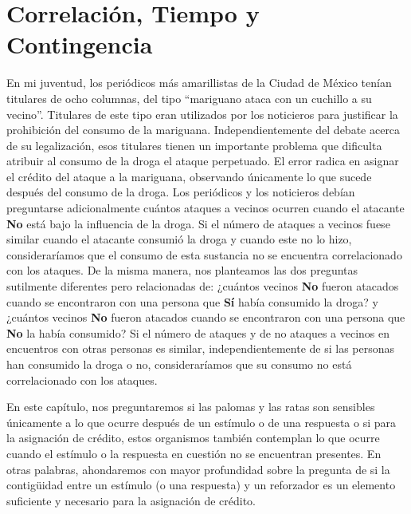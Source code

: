 \documentclass[
  a4paper,
  DIV=11,
  numbers=noendperiod]{scrreprt}
\begin{document}

\chapter{Correlación, Tiempo y
Contingencia}\label{correlaciuxf3n-tiempo-y-contingencia}

En mi juventud, los periódicos más amarillistas de la Ciudad de México
tenían titulares de ocho columnas, del tipo ``mariguano ataca con un
cuchillo a su vecino''. Titulares de este tipo eran utilizados por los
noticieros para justificar la prohibición del consumo de la mariguana.
Independientemente del debate acerca de su legalización, esos titulares
tienen un importante problema que dificulta atribuir al consumo de la
droga el ataque perpetuado. El error radica en asignar el crédito del
ataque a la mariguana, observando únicamente lo que sucede después del
consumo de la droga. Los periódicos y los noticieros debían preguntarse
adicionalmente cuántos ataques a vecinos ocurren cuando el atacante
\textbf{No} está bajo la influencia de la droga. Si el número de ataques
a vecinos fuese similar cuando el atacante consumió la droga y cuando
este no lo hizo, consideraríamos que el consumo de esta sustancia no se
encuentra correlacionado con los ataques. De la misma manera, nos
planteamos las dos preguntas sutilmente diferentes pero relacionadas de:
¿cuántos vecinos \textbf{No} fueron atacados cuando se encontraron con
una persona que \textbf{Sí} había consumido la droga? y ¿cuántos vecinos
\textbf{No} fueron atacados cuando se encontraron con una persona que
\textbf{No} la había consumido? Si el número de ataques y de no ataques
a vecinos en encuentros con otras personas es similar,
independientemente de si las personas han consumido la droga o no,
consideraríamos que su consumo no está correlacionado con los ataques.

En este capítulo, nos preguntaremos si las palomas y las ratas son
sensibles únicamente a lo que ocurre después de un estímulo o de una
respuesta o si para la asignación de crédito, estos organismos también
contemplan lo que ocurre cuando el estímulo o la respuesta en cuestión
no se encuentran presentes. En otras palabras, ahondaremos con mayor
profundidad sobre la pregunta de si la contigüidad entre un estímulo (o
una respuesta) y un reforzador es un elemento suficiente y necesario
para la asignación de crédito.
\end{document}
